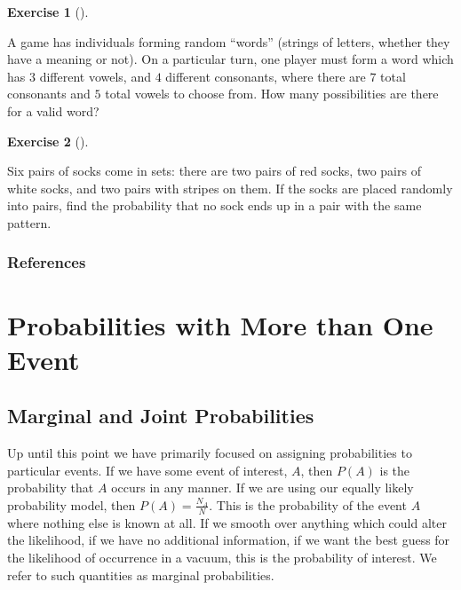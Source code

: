 \documentclass[
  letterpaper,
  DIV=11,
  numbers=noendperiod]{scrreprt}
\theoremstyle{definition}
\theoremstyle{definition}
\newtheorem{exercise}{Exercise}[chapter]
\theoremstyle{definition}
\theoremstyle{remark}
\begin{document}
\begin{exercise}[]\protect\hypertarget{exr-3.20}{}\label{exr-3.20}

A game has individuals forming random ``words'' (strings of letters,
whether they have a meaning or not). On a particular turn, one player
must form a word which has \(3\) different vowels, and \(4\) different
consonants, where there are \(7\) total consonants and \(5\) total
vowels to choose from. How many possibilities are there for a valid
word?

\end{exercise}

\begin{exercise}[]\protect\hypertarget{exr-3.21}{}\label{exr-3.21}

Six pairs of socks come in sets: there are two pairs of red socks, two
pairs of white socks, and two pairs with stripes on them. If the socks
are placed randomly into pairs, find the probability that no sock ends
up in a pair with the same pattern.

\end{exercise}

\subsection*{References}\label{references-1}

\chapter{Probabilities with More than One
Event}\label{probabilities-with-more-than-one-event}

\section{Marginal and Joint
Probabilities}\label{marginal-and-joint-probabilities}

Up until this point we have primarily focused on assigning probabilities
to particular events. If we have some event of interest, \(A\), then
\(P(A)\) is the probability that \(A\) occurs in any manner. If we are
using our equally likely probability model, then
\(P(A) = \frac{N_A}{N}\). This is the probability of the event \(A\)
where nothing else is known at all. If we smooth over anything which
could alter the likelihood, if we have no additional information, if we
want the best guess for the likelihood of occurrence in a vacuum, this
is the probability of interest. We refer to such quantities as marginal
probabilities.
\end{document}
